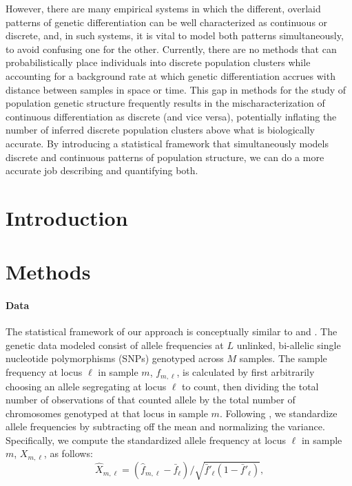 \documentclass[12pt]{article}
\begin{document}
However, there are many empirical systems in which the different, overlaid patterns of genetic 
differentiation can be well characterized as continuous or discrete, and, in such systems, it is 
vital to model both patterns simultaneously, to avoid confusing one for the other.  Currently, 
there are no methods that can probabilistically place individuals into discrete population clusters 
while accounting for a background rate at which genetic differentiation accrues with distance 
between samples in space or time.  This gap in methods for the study of population genetic 
structure frequently results in the mischaracterization of continuous differentiation as discrete 
(and vice versa), potentially inflating the number of inferred discrete population clusters 
above what is biologically accurate.  By introducing a statistical framework that simultaneously 
models discrete and continuous patterns of population structure, we can do a more accurate 
job describing and quantifying both.


%


\newpage
\section*{Introduction}

\section*{Methods}
\paragraph{Data}
The statistical framework of our approach is conceptually similar to \cite{Wasser2004} and \cite{spacemix}.
The genetic data modeled consist of allele frequencies at $L$ unlinked, bi-allelic single nucleotide polymorphisms (SNPs) genotyped across $M$ samples.
The sample frequency at locus $\ell$ in sample $m$, $f_{m,\ell}$, is calculated by first arbitrarily choosing an allele segregating 
at locus $\ell$ to count, 
then dividing the total number of observations of that counted allele by the total number of chromosomes genotyped at that locus
in sample $m$.
Following \cite{spacemix}, 
we standardize allele frequencies by subtracting off the mean and normalizing the variance. 
Specifically, we compute the standardized allele frequency at locus $\ell$ in sample $m$, $X_{m,\ell}$, as follows:
\begin{equation}
\hat{X}_{m,\ell} = (\hat{f}_{m,\ell}  - \bar{f}_{\ell})/\sqrt{\bar{f}'_{\ell}(1-\bar{f}'_{\ell})}\text{,}
\end{equation}
\end{document}
